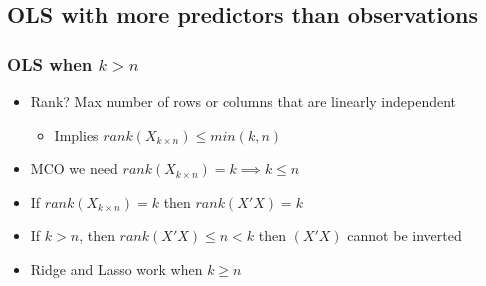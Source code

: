 \documentclass[
  shownotes,
  xcolor={svgnames},
  hyperref={colorlinks,citecolor=DarkBlue,linkcolor=DarkRed,urlcolor=DarkBlue}
  , aspectratio=169]{beamer}
\begin{document}
\subsection{OLS with more predictors than observations}
\begin{frame}[fragile]
\frametitle{OLS when $k>n$}

\begin{itemize}
  \item Rank? Max number of rows or columns that are linearly independent
  \begin{itemize}
  \item Implies $rank(X_{k\times n}) \leq min(k,n)$
  \end{itemize}
  \bigskip
  \item MCO we need $rank(X_{k\times n})=k \implies k\leq n$
  \bigskip
  \item If $rank(X_{k\times n})=k$ then $rank(X'X)=k$
  \bigskip
  \item If $k>n$, then  $rank(X'X)\leq n < k$ then $(X'X)$ cannot be inverted
  \bigskip
  \item Ridge and Lasso work when $k \geq n$
\end{itemize}

\end{frame}

\end{document}
